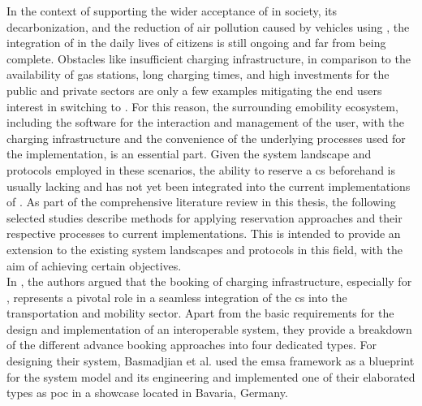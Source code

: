 In the context of supporting the wider acceptance of  in society, its decarbonization, and the reduction of air pollution caused by vehicles using  \cite{basmadjian_reference_2020}, the integration of  in the daily lives of citizens is still ongoing and far from being complete.
Obstacles like insufficient charging infrastructure, in comparison to the availability of gas stations, long charging times, and high investments for the public and private sectors \cite{basmadjian_reference_2020,orcioni_ev_2020} are only a few examples mitigating the end users interest in switching to .
For this reason, the surrounding \acrshort{emobility} ecosystem, including the software for the interaction and management of the user, with the charging infrastructure and the convenience of the underlying processes used for the implementation, is an essential part.
Given the system landscape and protocols employed in these scenarios, the ability to reserve a \acrshort{cs} beforehand is usually lacking and has not yet been integrated into the current implementations of .
As part of the comprehensive literature review in this thesis, the following selected studies describe methods for applying reservation approaches and their respective processes to current implementations. This is intended to provide an extension to the existing system landscapes and protocols in this field, with the aim of achieving certain objectives. \\
\noindent In \cite{basmadjian_interoperable_2019}, the authors argued that the booking of charging infrastructure, especially for , represents a pivotal role in a seamless integration of the \acrshort{cs} into the transportation and mobility sector.
Apart from the basic requirements for the design and implementation of an interoperable system, they provide a breakdown of the different advance booking approaches into four dedicated types. 
For designing their system, Basmadjian et al. used the \acrshort{emsa} \cite{kirpes_e-mobility_2019} framework as a blueprint for the system model and its engineering and implemented one of their elaborated types as \acrshort{poc} in a showcase located in Bavaria, Germany.
